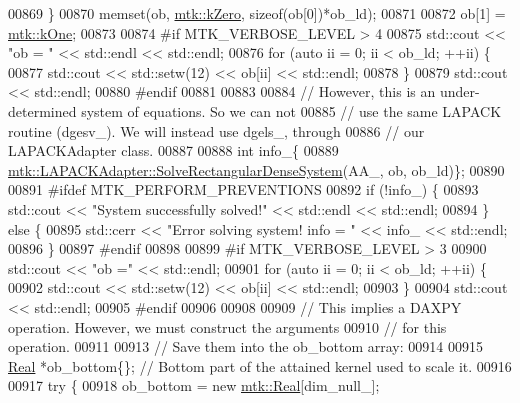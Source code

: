 \begin{DoxyCode}
{{00869     \}
00870     memset(ob, \hyperlink{group__c01-roots_ga59a451a5fae30d59649bcda274fea271}{mtk::kZero}, \textcolor{keyword}{sizeof}(ob[0])*ob\_ld);
00871 
00872     ob[1] = \hyperlink{group__c01-roots_ga26407c24d43b6b95480943340d285c71}{mtk::kOne};
00873 
00874 \textcolor{preprocessor}{    #if MTK\_VERBOSE\_LEVEL > 4}
00875     std::cout << \textcolor{stringliteral}{"ob = "} << std::endl << std::endl;
00876     \textcolor{keywordflow}{for} (\textcolor{keyword}{auto} ii = 0; ii < ob\_ld; ++ii) \{
00877       std::cout << std::setw(12) << ob[ii] << std::endl;
00878     \}
00879     std::cout << std::endl;
00880 \textcolor{preprocessor}{    #endif}
00881 
00883 
00884     \textcolor{comment}{// However, this is an under-determined system of equations. So we can not}
00885     \textcolor{comment}{// use the same LAPACK routine (dgesv\_). We will instead use dgels\_, through}
00886     \textcolor{comment}{// our LAPACKAdapter class.}
00887 
00888     \textcolor{keywordtype}{int} info\_\{
00889       \hyperlink{classmtk_1_1LAPACKAdapter_a380f148ffdf96bae2f79ae28f1a6560c}{mtk::LAPACKAdapter::SolveRectangularDenseSystem}(AA\_, 
      ob, ob\_ld)\};
00890 
00891 \textcolor{preprocessor}{    #ifdef MTK\_PERFORM\_PREVENTIONS}
00892     \textcolor{keywordflow}{if} (!info\_) \{
00893       std::cout << \textcolor{stringliteral}{"System successfully solved!"} << std::endl << std::endl;
00894     \} \textcolor{keywordflow}{else} \{
00895       std::cerr << \textcolor{stringliteral}{"Error solving system! info = "} << info\_ << std::endl;
00896     \}
00897 \textcolor{preprocessor}{    #endif}
00898 
00899 \textcolor{preprocessor}{    #if MTK\_VERBOSE\_LEVEL > 3}
00900     std::cout << \textcolor{stringliteral}{"ob ="} << std::endl;
00901     \textcolor{keywordflow}{for} (\textcolor{keyword}{auto} ii = 0; ii < ob\_ld; ++ii) \{
00902       std::cout << std::setw(12) << ob[ii] << std::endl;
00903     \}
00904     std::cout << std::endl;
00905 \textcolor{preprocessor}{    #endif}
00906 
00908 
00909     \textcolor{comment}{// This implies a DAXPY operation. However, we must construct the arguments}
00910     \textcolor{comment}{// for this operation.}
00911 
00913     \textcolor{comment}{// Save them into the ob\_bottom array:}
00914 
00915     \hyperlink{group__c01-roots_gac080bbbf5cbb5502c9f00405f894857d}{Real} *ob\_bottom\{\}; \textcolor{comment}{// Bottom part of the attained kernel used to scale it.}
00916 
00917     \textcolor{keywordflow}{try} \{
00918       ob\_bottom = \textcolor{keyword}{new} \hyperlink{group__c01-roots_gac080bbbf5cbb5502c9f00405f894857d}{mtk::Real}[dim\_null\_];
}}
\end{DoxyCode}
